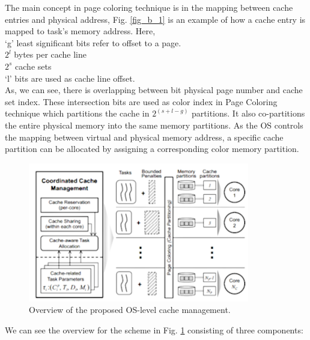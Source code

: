 \documentclass[conference]{IEEEtran}
\begin{document}
    The main concept in page coloring technique is in the mapping between cache entries and physical address, Fig. \ref{fig_b_1} is an example of how a cache entry is mapped to task’s memory address. Here,\\
    ‘g’  least significant bits refer to offset to a page.\\
    $2^l$  bytes per cache line\\
    $2^s$  cache sets\\
    ‘l’ bits are used as cache line offset.\\
    As, we can see, there is overlapping between bit physical page number and cache set index. These intersection bits are used as color index in Page Coloring technique which partitions the cache in $2^{(s+l-g)}$ partitions. It also co-partitions the entire physical memory into the same memory partitions. As the OS controls the mapping between virtual and physical memory address, a specific cache partition can be allocated by assigning a corresponding color memory partition.
    \begin{figure}[htbp]
        \centerline{\includegraphics{Overview_cache_management.png}}
        \caption{Overview of the proposed OS-level cache management.\cite{b2}}
        \label{fig_b_2}
    \end{figure}
    We can see the overview for the scheme in Fig. \ref{fig_b_2} consisting of three components:
\end{document}
